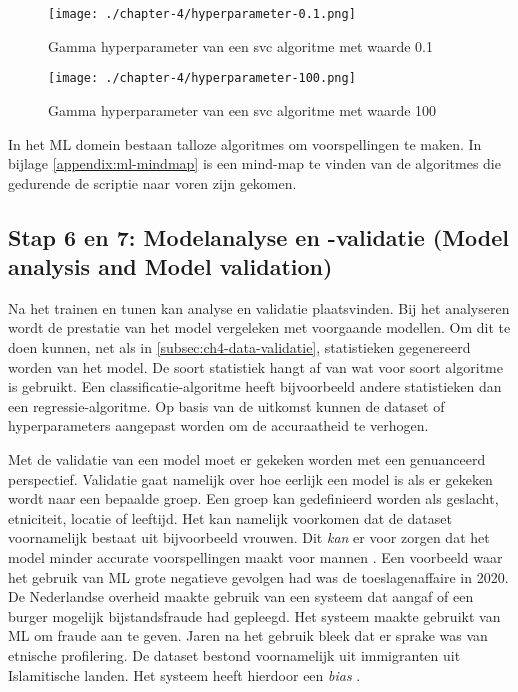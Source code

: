 \begin{figure}[hbt!]
  \centering
  \begin{minipage}{0.45\textwidth}
      \centering
      \texttt{[image: ./chapter-4/hyperparameter-0.1.png]}
      \caption{Gamma hyperparameter van een \acrfull{svc} algoritme met waarde 0.1}
      \label{fig:ch4-hyperparameter-example-0.1}
  \end{minipage}\hfill
  \begin{minipage}{0.45\textwidth}
      \centering
      \texttt{[image: ./chapter-4/hyperparameter-100.png]}
      \caption{Gamma hyperparameter van een \acrfull{svc} algoritme met waarde 100}
      \label{fig:ch4-hyperparameter-example-100}
  \end{minipage}
\end{figure}

In het ML domein bestaan talloze algoritmes om voorspellingen te maken. In bijlage \ref{appendix:ml-mindmap} is een mind-map te vinden van de algoritmes die gedurende de scriptie naar voren zijn gekomen. 

\subsection{Stap 6 en 7: Modelanalyse en -validatie (Model analysis and Model validation)}\label{subsec:ch4-model-analyse-en-validatie}
Na het trainen en tunen kan analyse en validatie plaatsvinden. Bij het analyseren wordt de prestatie van het model vergeleken met voorgaande modellen. Om dit te doen kunnen, net als in \autoref{subsec:ch4-data-validatie}, statistieken gegenereerd worden van het model. De soort statistiek hangt af van wat voor soort algoritme is gebruikt. Een classificatie-algoritme heeft bijvoorbeeld andere statistieken dan een regressie-algoritme. Op basis van de uitkomst kunnen de dataset of hyperparameters aangepast worden om de accuraatheid te verhogen.

Met de validatie van een model moet er gekeken worden met een genuanceerd perspectief. Validatie gaat namelijk over hoe eerlijk een model is als er gekeken wordt naar een bepaalde groep. Een groep kan gedefinieerd worden als geslacht, etniciteit, locatie of leeftijd. Het kan namelijk voorkomen dat de dataset voornamelijk bestaat uit bijvoorbeeld vrouwen. Dit \textit{kan} er voor zorgen dat het model minder accurate voorspellingen maakt voor mannen \cite[p.~109-110]{introduction-to-machine-learning}. Een voorbeeld waar het gebruik van ML grote negatieve gevolgen had was de toeslagenaffaire in 2020. De Nederlandse overheid maakte gebruik van een systeem dat aangaf of een burger mogelijk bijstandsfraude had gepleegd. Het systeem maakte gebruikt van ML om fraude aan te geven. Jaren na het gebruik bleek dat er sprake was van etnische profilering. De dataset bestond voornamelijk uit immigranten uit Islamitische landen. Het systeem heeft hierdoor een \textit{bias} \cite{ml-fairness-dutch-syri}.

